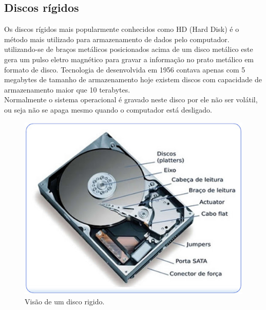 \subsection{Discos rígidos}
\label{subsection:Discos}
Os discos rígidos mais popularmente conhecidos como HD (Hard Disk) é o método mais utilizado para armazenamento de dados pelo computador. utilizando-se de braços metálicos posicionados acima de um disco metálico este gera um pulso eletro magnético para gravar a informação no prato metálico em formato de disco. Tecnologia de desenvolvida em 1956 contava apenas com 5 megabytes de tamanho de armazenamento hoje existem discos com capacidade de armazenamento maior que 10 terabytes.\\
Normalmente o sistema operacional é gravado  neste disco por ele não ser volátil, ou seja não se apaga mesmo quando o computador está desligado.

\begin{figure}[htpb]
    \centering
   \includegraphics[scale=0.25]{imagens/disco.jpg}
   \caption{Visão de um disco rigido.}
   \label{fig:disco}
\end{figure}